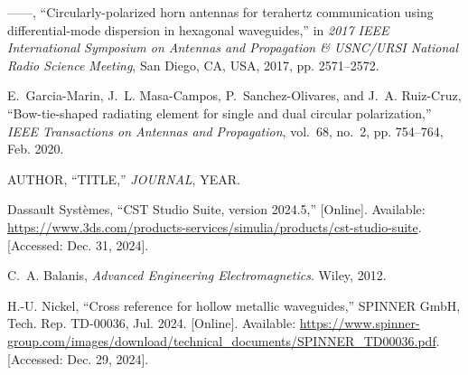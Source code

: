 \documentclass[lettersize,journal]{IEEEtran}
\begin{document}
\begin{thebibliography}{1}
    ------, ``Circularly-polarized horn antennas for terahertz communication using differential-mode dispersion in hexagonal waveguides,'' in \emph{2017 IEEE International Symposium on Antennas and Propagation \& USNC/URSI National Radio Science Meeting}, San Diego, CA, USA, 2017, pp. 2571--2572.
    
    E.~Garcia-Marin, J.~L. Masa-Campos, P.~Sanchez-Olivares, and J.~A. Ruiz-Cruz, ``Bow-tie-shaped radiating element for single and dual circular polarization,'' \emph{IEEE Transactions on Antennas and Propagation}, vol.~68, no.~2, pp. 754--764, Feb. 2020.
    
    AUTHOR, ``TITLE,'' \emph{JOURNAL}, YEAR.

    Dassault Syst{\`e}mes, ``CST Studio Suite, version 2024.5,'' [Online]. Available: \url{https://www.3ds.com/products-services/simulia/products/cst-studio-suite}. [Accessed: Dec. 31, 2024].

    C.~A. Balanis, \emph{Advanced Engineering Electromagnetics}. Wiley, 2012.

    H.-U. Nickel, ``Cross reference for hollow metallic waveguides,'' SPINNER GmbH, Tech. Rep. TD-00036, Jul. 2024. [Online]. Available: \url{https://www.spinner-group.com/images/download/technical_documents/SPINNER_TD00036.pdf}. [Accessed: Dec. 29, 2024].
    
    \end{thebibliography}
\end{document}
